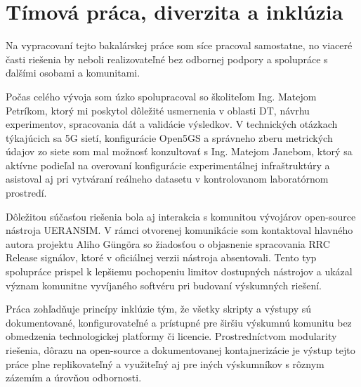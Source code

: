 \section{Tímová práca, diverzita a inklúzia}

Na vypracovaní tejto bakalárskej práce som síce pracoval samostatne, no viaceré časti riešenia by neboli realizovateľné bez odbornej podpory a spolupráce s ďalšími osobami a komunitami.

Počas celého vývoja som úzko spolupracoval so školiteľom Ing. Matejom Petríkom, ktorý mi poskytol dôležité usmernenia v oblasti DT, návrhu experimentov, spracovania dát a validácie výsledkov. V technických otázkach týkajúcich sa 5G sietí, konfigurácie Open5GS a správneho zberu metrických údajov zo siete som mal možnosť konzultovať s Ing. Matejom Janebom, ktorý sa aktívne podieľal na overovaní konfigurácie experimentálnej infraštruktúry a asistoval aj pri vytváraní reálneho datasetu v kontrolovanom laboratórnom prostredí.

Dôležitou súčasťou riešenia bola aj interakcia s komunitou vývojárov open-source nástroja UERANSIM. V rámci otvorenej komunikácie som kontaktoval hlavného autora projektu Aliho Güngöra so žiadosťou o objasnenie spracovania RRC Release signálov, ktoré v oficiálnej verzii nástroja absentovali. Tento typ spolupráce prispel k lepšiemu pochopeniu limitov dostupných nástrojov a ukázal význam komunitne vyvíjaného softvéru pri budovaní výskumných riešení.

Práca zohľadňuje princípy inklúzie tým, že všetky skripty a výstupy sú dokumentované, konfigurovateľné a prístupné pre širšiu výskumnú komunitu bez obmedzenia technologickej platformy či licencie. Prostredníctvom modularity riešenia, dôrazu na open-source a dokumentovanej kontajnerizácie je výstup tejto práce plne replikovateľný a využiteľný aj pre iných výskumníkov s rôznym zázemím a úrovňou odbornosti.
